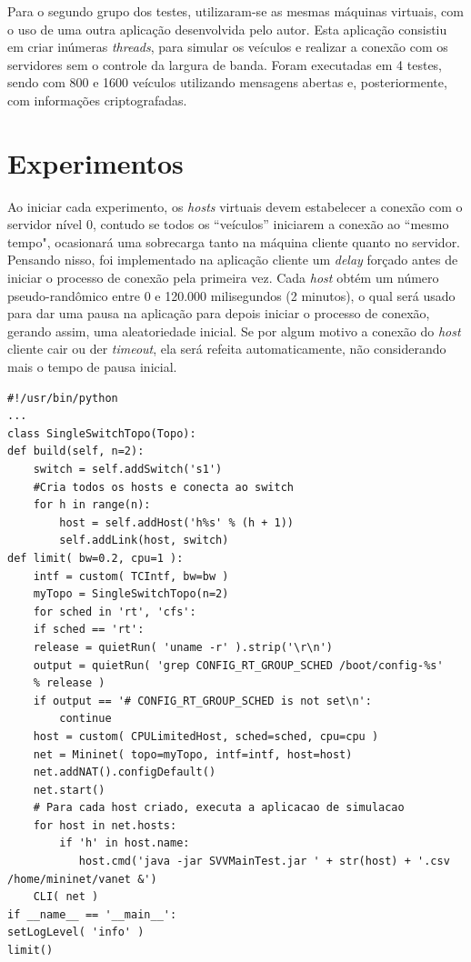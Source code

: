 \documentclass[
	12pt,				%
	oneside,			%
	a4paper,			%
	english,			%
	brazil				%
	]{abntex2ppgsi}
\begin{document}
Para o segundo grupo dos testes, utilizaram-se as mesmas máquinas virtuais, com o uso de uma outra aplicação desenvolvida pelo autor. Esta aplicação consistiu em criar inúmeras \textit{threads}, para simular os veículos e realizar a conexão com os servidores sem o controle da largura de banda. Foram executadas em 4 testes, sendo com 800 e 1600 veículos utilizando mensagens abertas e, posteriormente, com informações criptografadas.

\section{Experimentos}

Ao iniciar cada experimento, os \textit{hosts} virtuais devem estabelecer a conexão com o servidor nível 0, contudo se todos os ``veículos''  iniciarem a conexão ao ``mesmo tempo", ocasionará uma sobrecarga tanto na máquina cliente quanto no servidor. Pensando nisso, foi implementado na aplicação cliente um \textit{delay} forçado antes de iniciar o processo de conexão pela primeira vez. Cada \textit{host} obtém um número pseudo-randômico entre 0 e 120.000 milisegundos (2 minutos), o qual será usado para dar uma pausa na aplicação para depois iniciar o processo de conexão, gerando assim, uma aleatoriedade inicial. Se por algum motivo a conexão do \textit{host} cliente cair ou der \textit{timeout}, ela será refeita automaticamente, não considerando mais o tempo de pausa inicial. 




\begin{lstlisting}[caption=Script Python para criação dos hosts no mininet., label=src:python]
#!/usr/bin/python
...
class SingleSwitchTopo(Topo):
def build(self, n=2):
    switch = self.addSwitch('s1')
    #Cria todos os hosts e conecta ao switch
    for h in range(n):	
		host = self.addHost('h%s' % (h + 1))
		self.addLink(host, switch)
def limit( bw=0.2, cpu=1 ):
	intf = custom( TCIntf, bw=bw )
	myTopo = SingleSwitchTopo(n=2)
	for sched in 'rt', 'cfs':
	if sched == 'rt':
	release = quietRun( 'uname -r' ).strip('\r\n')
	output = quietRun( 'grep CONFIG_RT_GROUP_SCHED /boot/config-%s'
	% release )
	if output == '# CONFIG_RT_GROUP_SCHED is not set\n':
		continue
	host = custom( CPULimitedHost, sched=sched, cpu=cpu )
	net = Mininet( topo=myTopo, intf=intf, host=host)
	net.addNAT().configDefault()
	net.start()
	# Para cada host criado, executa a aplicacao de simulacao
	for host in net.hosts:
		if 'h' in host.name:
		   host.cmd('java -jar SVVMainTest.jar ' + str(host) + '.csv /home/mininet/vanet &')
	CLI( net )
if __name__ == '__main__':
setLogLevel( 'info' )
limit()
\end{lstlisting}
\end{document}
